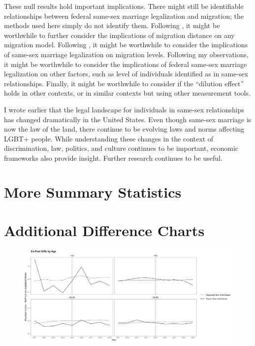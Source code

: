 \documentclass[12pt,letterpaper]{article}
\begin{document}
These null results hold important implications. There might still be identifiable relationships between federal same-sex marriage legalization and migration; the methods used here simply do not identify them. Following \citet{1, 12}, it might be worthwhile to further consider the implications of migration distance on any migration model. Following \citet{15}, it might be worthwhile to consider the implications of same-sex marriage legalization on migration levels. Following my observations, it might be worthwhile to consider the implications of federal same-sex marriage legalization on other factors, such as level of individuals identified as in same-sex relationships. Finally, it might be worthwhile to consider if the “dilution effect” holds in other contexts, or in similar contexts but using other measurement tools.

I wrote earlier that the legal landscape for individuals in same-sex relationships has changed dramatically in the United States. Even though same-sex marriage is now the law of the land, there continue to be evolving laws and norms affecting LGBT+ people. While understanding these changes in the context of discrimination, law, politics, and culture continues to be important, economic frameworks also provide insight. Further research continues to be useful.

\newpage



\newpage
\appendix
\FloatBarrier
\section{More Summary Statistics}



\begin{landscape}

\end{landscape}


\FloatBarrier
\newpage
\section{Additional Difference Charts}
\begin{figure}[h]
    \centering
    \includegraphics[width=0.75\linewidth]{outputs/summary_stats/age_post_diffs.png}
    \caption{}
    \label{}
\end{figure}
\end{document}
